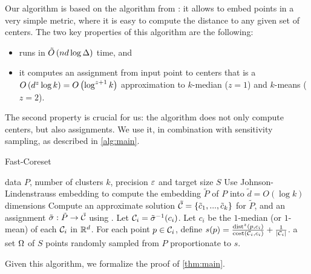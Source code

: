 Our algorithm is based on the \fkmeans algorithm from \cite{cohen2020fast}: it allows to embed points in a very simple metric,  where it is easy to compute the
distance to any given set of centers. The two key properties of this algorithm are the following: 
\begin{itemize}
\item \fkmeans runs in $\tilde O\left( n d \log \Delta\right)$ time, and
\item it computes an assignment from input point to centers that is a $O\left( d^z \log k\right) = O\left(\log^{z+1} k\right)$ approximation to $k$-median ($z=1$) and
$k$-means ($z=2$).
\end{itemize}

The second property is crucial for us: the algorithm does not only compute centers, but also assignments. 
  We use it, in combination with sensitivity sampling, as described in \cref{alg:main}.


\begin{algorithm}[tb]
   \caption{Fast-Coreset}
   \label{alg:main}
\begin{algorithmic}
    data $P$, number of clusters $k$, precision $\varepsilon$ and target size $S$
   \STATE Use Johnson-Lindenstrauss embedding to compute the embedding $\tilde P$ of $P$ into $\tilde d = O(\log k)$ dimensions
   \STATE Compute an approximate solution $\tilde {\mathcal C} = \left\{ \tilde c_1, ..., \tilde c_k\right\} $ for $\tilde P$, and an assignment $\tilde \sigma : \tilde P \rightarrow \tilde {\mathcal C}$ using \fkmeans.	
   \STATE Let $\mathcal C_i = \tilde \sigma^{-1}(c_i)$.
   \STATE Let $c_i$ be the $1$-median (or $1$-mean) of each $\mathcal C_i$ in $\mathbb{R}^d$.%
   \STATE For each point $p \in \mathcal C_i$, define
   $s(p) = \frac{\operatorname{dist}^z(p, c_i)}{\operatorname{cost}(\mathcal C_i, c_i)}+ \frac{1}{|\mathcal C_i|}$.
    a set $\Omega$ of $S$ points randomly sampled from $P$ proportionate to $s$.
\end{algorithmic}
\end{algorithm}


Given this algorithm, we formalize the proof of \cref{thm:main}.

